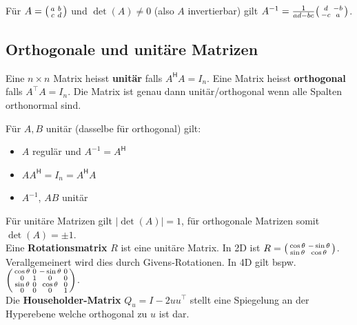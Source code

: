 \documentclass[a4paper,10pt]{article}
\newcommand*{\hermconj}{\mathsf{H}}
\begin{document}
Für $A = \begin{psmallmatrix*}
  a & b \\
  c & d
\end{psmallmatrix*}$ und $\det(A) \neq 0$ (also $A$ invertierbar) gilt $A^{-1} = \frac{1}{ad - bc} \begin{psmallmatrix*}
  d & -b \\
  -c & a
\end{psmallmatrix*}$.

\subsection{Orthogonale und unitäre Matrizen}

Eine $n \times n$ Matrix heisst \textbf{unitär} falls $A^\hermconj A = I_n$. Eine Matrix heisst \textbf{orthogonal} falls $A^\top A = I_n$. Die Matrix ist genau dann unitär/orthogonal wenn alle Spalten orthonormal sind.

Für $A, B$ unitär (dasselbe für orthogonal) gilt:

\begin{itemize}
  \item $A$ regulär und $A^{-1} = A^\hermconj$
  \item $AA^\hermconj = I_n = A^\hermconj A$
  \item $A^{-1}$, $AB$ unitär
\end{itemize}

Für unitäre Matrizen gilt $| \det(A) | = 1$, für orthogonale Matrizen somit $\det(A) = \pm 1$.\\

Eine \textbf{Rotationsmatrix} $R$ ist eine unitäre Matrix. In 2D ist $R = \begin{psmallmatrix*}
  \cos \theta & -\sin \theta \\
  \sin \theta & \cos \theta
\end{psmallmatrix*}$. Verallgemeinert wird dies durch Givens-Rotationen. In 4D gilt bspw. $\begin{psmallmatrix}
  \cos \theta & 0 & -\sin \theta & 0 \\
  0 & 1 & 0 & 0 \\
  \sin \theta & 0 & \cos \theta & 0 \\
  0 & 0 & 0 & 1
\end{psmallmatrix}$.\\

Die \textbf{Householder-Matrix} $Q_u = I - 2uu^\top$ stellt eine Spiegelung an der Hyperebene welche orthogonal zu $u$ ist dar.
\end{document}

